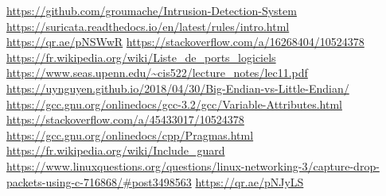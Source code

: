 \documentclass[a4paper]{article}
\begin{document}
\newpage \tableofcontents \listoffigures
\begin{thebibliography}{9}
 {\small \url{https://github.com/groumache/Intrusion-Detection-System}}
 {\small \url{https://suricata.readthedocs.io/en/latest/rules/intro.html}}
 {\small \url{https://qr.ae/pNSWwR}}
 {\small \url{https://stackoverflow.com/a/16268404/10524378}}
 {\small \url{https://fr.wikipedia.org/wiki/Liste_de_ports_logiciels}}
 {\small \url{https://www.seas.upenn.edu/~cis522/lecture_notes/lec11.pdf}}
 {\small \url{https://uynguyen.github.io/2018/04/30/Big-Endian-vs-Little-Endian/}}
 {\small \url{https://gcc.gnu.org/onlinedocs/gcc-3.2/gcc/Variable-Attributes.html}}
 {\small \url{https://stackoverflow.com/a/45433017/10524378}}
 {\small \url{https://gcc.gnu.org/onlinedocs/cpp/Pragmas.html}}
 {\small \url{https://fr.wikipedia.org/wiki/Include_guard}}
 {\small \url{https://www.linuxquestions.org/questions/linux-networking-3/capture-drop-packets-using-c-716868/#post3498563}}
 {\small \url{https://qr.ae/pNJyLS}}
\end{thebibliography}
\end{document}
